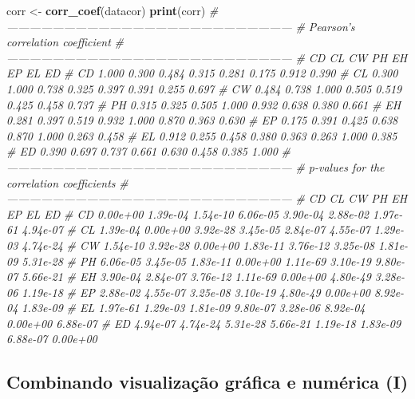 \documentclass[
]{book}
\newenvironment{Shaded}{\begin{snugshade}}{\end{snugshade}}
\newcommand{\CommentTok}[1]{\textcolor[rgb]{0.56,0.35,0.01}{\textit{#1}}}
\newcommand{\KeywordTok}[1]{\textcolor[rgb]{0.13,0.29,0.53}{\textbf{#1}}}
\newcommand{\NormalTok}[1]{#1}
\newcommand{\StringTok}[1]{\textcolor[rgb]{0.31,0.60,0.02}{#1}}
\begin{document}

\begin{Shaded}
\begin{Highlighting}[]
\NormalTok{corr <-}\StringTok{ }\KeywordTok{corr_coef}\NormalTok{(datacor)}
\KeywordTok{print}\NormalTok{(corr)}
\CommentTok{# ---------------------------------------------------------------------------}
\CommentTok{# Pearson's correlation coefficient}
\CommentTok{# ---------------------------------------------------------------------------}
\CommentTok{#       CD    CL    CW    PH    EH    EP    EL    ED}
\CommentTok{# CD 1.000 0.300 0.484 0.315 0.281 0.175 0.912 0.390}
\CommentTok{# CL 0.300 1.000 0.738 0.325 0.397 0.391 0.255 0.697}
\CommentTok{# CW 0.484 0.738 1.000 0.505 0.519 0.425 0.458 0.737}
\CommentTok{# PH 0.315 0.325 0.505 1.000 0.932 0.638 0.380 0.661}
\CommentTok{# EH 0.281 0.397 0.519 0.932 1.000 0.870 0.363 0.630}
\CommentTok{# EP 0.175 0.391 0.425 0.638 0.870 1.000 0.263 0.458}
\CommentTok{# EL 0.912 0.255 0.458 0.380 0.363 0.263 1.000 0.385}
\CommentTok{# ED 0.390 0.697 0.737 0.661 0.630 0.458 0.385 1.000}
\CommentTok{# ---------------------------------------------------------------------------}
\CommentTok{# p-values for the correlation coefficients}
\CommentTok{# ---------------------------------------------------------------------------}
\CommentTok{#          CD       CL       CW       PH       EH       EP       EL       ED}
\CommentTok{# CD 0.00e+00 1.39e-04 1.54e-10 6.06e-05 3.90e-04 2.88e-02 1.97e-61 4.94e-07}
\CommentTok{# CL 1.39e-04 0.00e+00 3.92e-28 3.45e-05 2.84e-07 4.55e-07 1.29e-03 4.74e-24}
\CommentTok{# CW 1.54e-10 3.92e-28 0.00e+00 1.83e-11 3.76e-12 3.25e-08 1.81e-09 5.31e-28}
\CommentTok{# PH 6.06e-05 3.45e-05 1.83e-11 0.00e+00 1.11e-69 3.10e-19 9.80e-07 5.66e-21}
\CommentTok{# EH 3.90e-04 2.84e-07 3.76e-12 1.11e-69 0.00e+00 4.80e-49 3.28e-06 1.19e-18}
\CommentTok{# EP 2.88e-02 4.55e-07 3.25e-08 3.10e-19 4.80e-49 0.00e+00 8.92e-04 1.83e-09}
\CommentTok{# EL 1.97e-61 1.29e-03 1.81e-09 9.80e-07 3.28e-06 8.92e-04 0.00e+00 6.88e-07}
\CommentTok{# ED 4.94e-07 4.74e-24 5.31e-28 5.66e-21 1.19e-18 1.83e-09 6.88e-07 0.00e+00}
\end{Highlighting}
\end{Shaded}

\hypertarget{combinando-visualizauxe7uxe3o-gruxe1fica-e-numuxe9rica-i}{%
\subsection{Combinando visualização gráfica e numérica (I)}\label{combinando-visualizauxe7uxe3o-gruxe1fica-e-numuxe9rica-i}}
\end{document}
